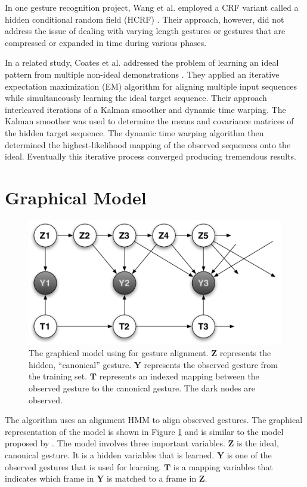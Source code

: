 \documentclass{article}
\begin{document}
In one gesture recognition project, Wang et al. employed a
CRF variant called a hidden conditional random field (HCRF) \cite{Wang2006}. Their approach,
however, did not address the issue of dealing with varying length gestures or
gestures that are compressed or expanded in time during various phases.

In a related study, Coates et al. addressed the problem of
learning an ideal pattern from multiple non-ideal demonstrations \cite{Coates2008}. They applied
an iterative expectation maximization (EM) algorithm for aligning multiple input
sequences while simultaneously learning the ideal target sequence. Their
approach interleaved iterations of a Kalman smoother and dynamic time warping.
The Kalman smoother \cite{Muphy2002} was used to determine the means and
covariance matrices of the hidden target sequence. The dynamic time warping
algorithm \cite{Listgarten2005} then determined the highest-likelihood mapping
of the observed sequences onto the ideal. Eventually this iterative process
converged producing tremendous results.

\section{Graphical Model}

\begin{figure}
\begin{centering}
\includegraphics[width=0.65\columnwidth]{figures/model_tau_unobserved.pdf}

\caption{The graphical model using for gesture alignment. $\mathbf{Z}$
represents the hidden, ``canonical'' gesture. $\mathbf{Y}$ represents the
observed gesture from the training set. $\mathbf{T}$ represents an indexed
mapping between the observed gesture to the canonical gesture. The dark nodes
are observed. \label{figure:model_tau_unobserved}}

\end{centering}
\end{figure}


The algorithm uses an alignment HMM to align observed gestures. The graphical
representation of the model is shown in Figure \ref{figure:model_tau_unobserved}
and is similar to the model proposed by \cite{Coates2008}. The model involves
three important variables. $\mathbf{Z}$ is the ideal, canonical gesture. It is a
hidden variables that is learned. $\mathbf{Y}$ is one of the observed gestures
that is used for learning. $\mathbf{T}$ is a mapping variables that indicates
which frame in $\mathbf{Y}$ is matched to a frame in $\mathbf{Z}$.
\end{document}
